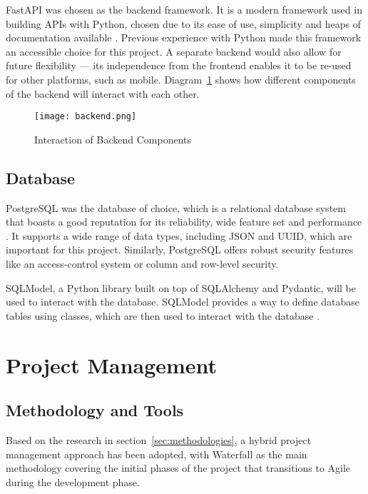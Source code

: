FastAPI was chosen as the backend framework. It is a modern framework used in building APIs with Python, chosen due to its ease of use, simplicity and heaps of documentation available \parencite{fastapi}. Previous experience with Python made this framework an accessible choice for this project. A separate backend would also allow for future flexibility --- its independence from the frontend enables it to be re-used for other platforms, such as mobile. Diagram~\ref{fig:backend} shows how different components of the backend will interact with each other.

\begin{figure}[htbp]
    \centering
    \texttt{[image: backend.png]}
    \caption{Interaction of Backend Components}\label{fig:backend}
\end{figure}

\FloatBarrier{}

\subsection{Database}

PostgreSQL was the database of choice, which is a relational database system that boasts a good reputation for its reliability, wide feature set and performance \parencite{postgres}. It supports a wide range of data types, including JSON and UUID, which are important for this project. Similarly, PostgreSQL offers robust security features like an access-control system or column and row-level security. 

SQLModel, a Python library built on top of SQLAlchemy and Pydantic, will be used to interact with the database. SQLModel provides a way to define database tables using classes, which are then used to interact with the database \parencite{sqlmodel}.

\section{Project Management}

\subsection{Methodology and Tools}

Based on the research in section~\ref{sec:methodologies}, a hybrid project management approach has been adopted, with Waterfall as the main methodology covering the initial phases of the project that transitions to Agile during the development phase.

